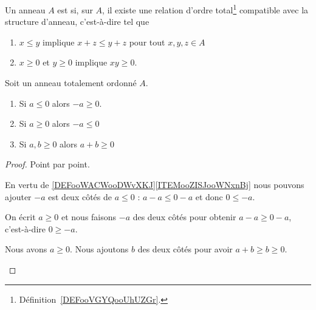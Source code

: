 \begin{definition}	\label{DEFooWACWooDWvXKJ}
	Un anneau \( A\) est  si, sur \( A \),  il existe une relation d'ordre total\footnote{Définition~\ref{DEFooVGYQooUhUZGr}.} compatible avec la structure d'anneau, c'est-à-dire tel que
	\begin{enumerate}
		\item       \label{ITEMooZISJooWNxnBj}
		      \( x\leq y\) implique \( x+z\leq y+z\) pour tout \( x,y,z\in A\)
		\item   \label{CONDooBYYDooElXgPO}
		      \( x\geq 0\) et \( y\geq 0\) implique \( xy\geq 0\).
	\end{enumerate}
\end{definition}


\begin{proposition}	\label{PROPooELXCooCYzEVD}
	Soit un anneau totalement ordonné \( A\).
	\begin{enumerate}
		\item   \label{ITEMooRRUGooRUpYwt}
		      Si \( a\leq 0\) alors \( -a\geq 0\).
		\item	\label{ITEMooNKYCooCmqHsO}
		      Si \( a\geq 0\) alors \( -a\leq 0\)
		\item	\label{ITEMooXOTGooYxKubR}
		      Si \( a,b\geq 0\) alors \( a+b\geq 0\)
	\end{enumerate}
\end{proposition}

\begin{proof}
	Point par point.
	\begin{subproof}
		En vertu de \ref{DEFooWACWooDWvXKJ}\ref{ITEMooZISJooWNxnBj} nous pouvons ajouter \( -a\) est deux côtés de \( a\leq 0\) : \( a-a\leq 0-a\) et donc \( 0\leq -a\).

		On écrit \( a\geq 0\) et nous faisons \( -a\) des deux côtés pour obtenir \( a-a\geq 0-a\), c'est-à-dire \( 0\geq -a\).

		Nous avons \( a\geq 0\). Nous ajoutons \( b\) des deux côtés pour avoir \( a+b\geq b\geq 0\).
	\end{subproof}
\end{proof}


